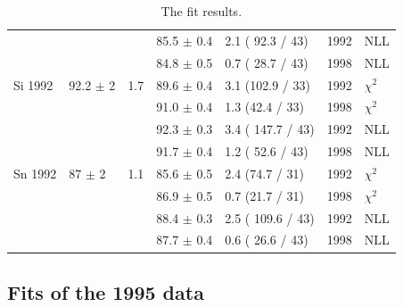 \begin{table}[h]
\begin{center}
\begin{tabular}{|l||l|l|l|l|l|l|}
                 &                &     & 85.5 $\pm$ 0.4 & 2.1 ( 92.3 / 43) & 1992 & NLL \\
                 &                &     & 84.8 $\pm$ 0.5 & 0.7 ( 28.7 / 43) & 1998 & NLL \\
      \hline                                                                 
       Si 1992   & 92.2 $\pm$ 2   & 1.7 & 89.6 $\pm$ 0.4 &  3.1 (102.9 / 33)& 1992 & $\chi^2$ \\  
                 &                &     & 91.0 $\pm$ 0.4 &  1.3 (42.4 / 33) & 1998 & $\chi^2$ \\  
                                                                             
                 &                &     & 92.3 $\pm$ 0.3 & 3.4 ( 147.7 / 43)& 1992 & NLL \\
                 &                &     & 91.7 $\pm$ 0.4 & 1.2 ( 52.6 / 43) & 1998 & NLL \\
      \hline                                                                 
       Sn 1992   & 87   $\pm$ 2   & 1.1 & 85.6 $\pm$ 0.5 &  2.4 (74.7 / 31) & 1992 & $\chi^2$ \\  
                 &                &     & 86.9 $\pm$ 0.5 &  0.7 (21.7 / 31) & 1998 & $\chi^2$ \\  
                                                                             
                 &                &     & 88.4 $\pm$ 0.3 & 2.5 ( 109.6 / 43) & 1992 & NLL \\
                 &                &     & 87.7 $\pm$ 0.4 & 0.6 ( 26.6 / 43) & 1998 & NLL \\
      \hline                           
    \end{tabular}
  \end{center}
  \caption{The fit results.}
  \label{table:fits1992}
\end{table}

\subsection { Fits of the 1995 data }

